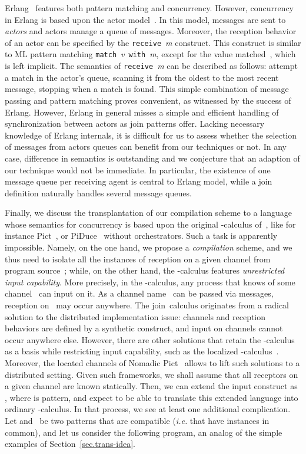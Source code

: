 \documentclass{LMCS}
\makeatletter
\newcommand{\ie}{\emph{i.e.}\@\xspace}
\newcommand{\erlang}{\textrm{Erlang}\xspace}
\renewcommand{\_}{\mathord{\rule[-.25ex]{1ex}{.15ex}}}
\makeatother
\begin{document}
\erlang~\cite{Erlang} features both pattern matching and concurrency.
However, concurrency in Erlang is based upon the actor
model~\cite{actor73,actor86}. In this model, messages are sent to
\emph{actors} and actors manage a queue of messages.
Moreover, the
reception behavior of an actor can be specified by
the  \texttt{receive}~\textit{m} construct.
This construct is similar to ML pattern matching
\texttt{match}~\textit{v}~\texttt{with}~\textit{m}, except for the
value matched~, which is left implicit.
The semantics of \texttt{receive}~\textit{m}
can be described as follows: attempt a match in the actor's queue,
scanning it from the oldest to the most
recent message, stopping when a match is found.
This simple combination of message passing and pattern
matching proves convenient, as witnessed by the success of Erlang.
However, \erlang in general misses a simple and efficient handling of
synchronization between actors as join patterns offer. Lacking
necessary knowledge of \erlang internals, it is difficult for us to
assess whether the selection of messages from actors queues can
benefit from our techniques or not. In any case, difference in
semantics is outstanding and we conjecture that an adaption of our
technique would not be immediate. In particular, the existence of one
message queue per receiving agent is central to \erlang model, while a
join definition naturally handles several message queues.

Finally, we discuss the transplantation of our compilation scheme to a
language whose semantics for concurrency is based upon the original
-calculus of~\cite{MPW92}, like for instance
\textrm{Pict}~\cite{Pict}, or \textrm{PiDuce}~\cite{PiDuce:2005}
without orchestrators.  Such a task is apparently impossible.  Namely,
on the one hand, we propose a \emph{compilation} scheme, and we thus
need to isolate all the instances of reception on a given channel from
program source~; while, on the other hand, the -calculus features
\emph{unrestricted input capability}.
More precisely, in the  -calculus,
any process that knows of some
channel~ can input on it.  As a channel name~ can be passed via
messages, reception on~ may occur anywhere.  The join~calculus
originates from a radical solution to the distributed implementation
issue: channels and reception behaviors are defined by a synthetic
construct, and input on channels cannot occur anywhere else.  However,
there are other solutions that retain the -calculus as a basis
while restricting input capability, such as the localized
-calculus~\cite{Merro98asynchrony}.
Moreover, the located channels of Nomadic Pict~\cite{nomadic}
allows to lift such solutions to a distributed setting.
Given such frameworks, we
shall assume that all receptors on a given channel are known
statically.  Then, we can extend the input construct  as
, where  is pattern, and expect to be able to translate
this extended language into ordinary -calculus.  In that process,
we see at least one additional complication.  Let  and~
be two patterns that are compatible (\ie that have instances in
common), and let us consider the following program, an analog of the
simple examples of Section~\ref{sec.trans-idea}.
\end{document}
